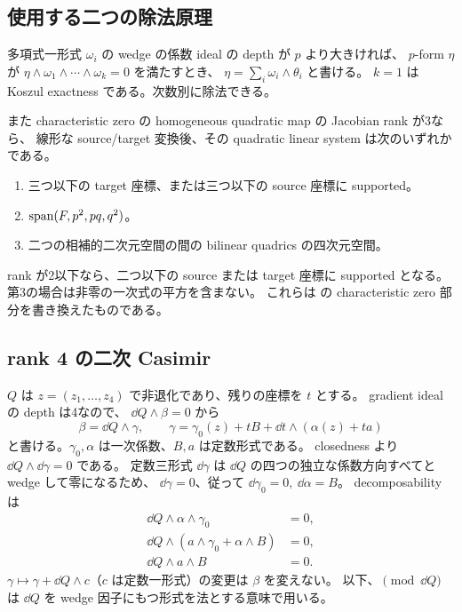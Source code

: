\documentclass[11pt,a4paper]{ltjsarticle}
\theoremstyle{remark}\newtheorem{remark}[theorem]{注意}\renewcommand{\proofname}{証明}
\begin{document}
\subsection{使用する二つの除法原理}
多項式一形式 $\omega_i$ の wedge の係数 ideal の depth が $p$ より大きければ、
$p$-form $\eta$ が $\eta\wedge\omega_1\wedge\cdots\wedge\omega_k=0$ を満たすとき、
$\eta=\sum_i\omega_i\wedge\theta_i$ と書ける。
$k=1$ は Koszul exactness である。次数別に除法できる。

また characteristic zero の homogeneous quadratic map の Jacobian rank が3なら、
線形な source/target 変換後、その quadratic linear system は次のいずれかである。
\begin{enumerate}
 \item 三つ以下の target 座標、または三つ以下の source 座標に supported。
 \item $\operatorname{span}(F,p^2,pq,q^2)$。
 \item 二つの相補的二次元空間の間の bilinear quadrics の四次元空間。
\end{enumerate}
rank が2以下なら、二つ以下の source または target 座標に supported となる。
第3の場合は非零の一次式の平方を含まない。
これらは \cite{DBS} の characteristic zero 部分を書き換えたものである。

\subsection{rank 4 の二次 Casimir}
$Q$ は $z=(z_1,\ldots,z_4)$ で非退化であり、残りの座標を $t$ とする。
gradient ideal の depth は4なので、
$\dd Q\wedge\beta=0$ から
\[
 \beta=\dd Q\wedge\gamma,\qquad
 \gamma=\gamma_0(z)+tB+\dd t\wedge(\alpha(z)+ta)
\]
と書ける。$\gamma_0,\alpha$ は一次係数、$B,a$ は定数形式である。
closedness より $\dd Q\wedge\dd\gamma=0$ である。
定数三形式 $\dd\gamma$ は $\dd Q$ の四つの独立な係数方向すべてと wedge して零になるため、
$\dd\gamma=0$、従って
$\dd\gamma_0=0,\ \dd\alpha=B$。
decomposability は
\begin{align}
 \dd Q\wedge\alpha\wedge\gamma_0&=0,\label{eq:d0}\\
 \dd Q\wedge(a\wedge\gamma_0+\alpha\wedge B)&=0,\label{eq:d1}\\
 \dd Q\wedge a\wedge B&=0.\label{eq:d2}
\end{align}
$\gamma\mapsto\gamma+\dd Q\wedge c$（$c$ は定数一形式）の変更は $\beta$ を変えない。
以下、$\pmod{\dd Q}$ は $\dd Q$ を wedge 因子にもつ形式を法とする意味で用いる。
\end{document}
